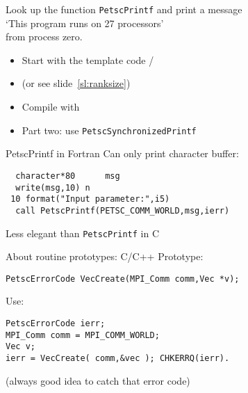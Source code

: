 \begin{exerciseframe}[hello]
Look up the function \lstinline{PetscPrintf} and print a message\\
`This program runs on 27 processors'\\
from process zero.

\begin{itemize}
\item Start with the template code /
\item (or see slide~\ref{sl:ranksize})
\item Compile with 
\item Part two: use \lstinline{PetscSynchronizedPrintf}
\end{itemize}
\end{exerciseframe}


\begin{fortran}
\begin{numberedframe}{PetscPrintf in Fortran}
Can only print character buffer:
\begin{lstlisting}
  character*80      msg
  write(msg,10) n
 10 format("Input parameter:",i5)
  call PetscPrintf(PETSC_COMM_WORLD,msg,ierr)
\end{lstlisting}
Less elegant than \lstinline{PetscPrintf} in C
\end{numberedframe}
\end{fortran}

\begin{c}
\begin{numberedframe}{About routine prototypes: C/C++}
  \label{sec:protos}
Prototype:
\begin{lstlisting}
PetscErrorCode VecCreate(MPI_Comm comm,Vec *v);
\end{lstlisting}
Use:
\begin{lstlisting}
PetscErrorCode ierr;
MPI_Comm comm = MPI_COMM_WORLD;
Vec v;
ierr = VecCreate( comm,&vec ); CHKERRQ(ierr).
\end{lstlisting}
(always good idea to catch that error code)
\end{numberedframe}
\end{c}

